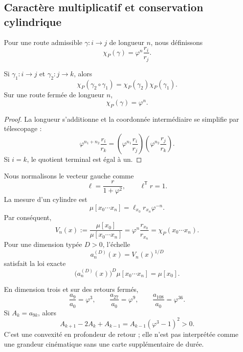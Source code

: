 \subsection{Caractère multiplicatif et conservation cylindrique}

Pour une route admissible \(\gamma:i\to j\) de longueur \(n\), nous définissons
\begin{equation}
 \chi_P(\gamma)=\varphi^n\frac{r_i}{r_j}.
 \label{p12-83-c9-s3:eq:caracter-parry-phi}
\end{equation}

\begin{proposition}
\label{p12-83-c9-s3:prop:multiplicatividad-parry-phi}
Si \(\gamma_1:i\to j\) et \(\gamma_2:j\to k\), alors
\[
 \chi_P(\gamma_2\circ\gamma_1)
 =\chi_P(\gamma_2)\chi_P(\gamma_1).
\]
Sur une route fermée de longueur \(n\),
\[
 \chi_P(\gamma)=\varphi^n.
\]
\end{proposition}

\begin{proof}
La longueur s’additionne et la coordonnée intermédiaire se simplifie par télescopage :
\[
 \varphi^{n_1+n_2}\frac{r_i}{r_k}
 =\left(\varphi^{n_1}\frac{r_i}{r_j}\right)
  \left(\varphi^{n_2}\frac{r_j}{r_k}\right).
\]
Si \(i=k\), le quotient terminal est égal à un.
\end{proof}

Nous normalisons le vecteur gauche comme
\[
 \ell=\frac{r}{1+\varphi^2},
 \qquad
 \ell^{\mathsf T}r=1.
\]
La mesure d’un cylindre est
\[
 \mu[x_0\cdots x_n]
 =\ell_{x_0}r_{x_n}\varphi^{-n}.
\]
Par conséquent,
\begin{equation}
 V_n(x)
 :=\frac{\mu[x_0]}{\mu[x_0\cdots x_n]}
 =\varphi^n\frac{r_{x_0}}{r_{x_n}}
 =\chi_P(x_0\cdots x_n).
 \label{p12-83-c9-s3:eq:volumen-cilindrico-phi}
\end{equation}
Pour une dimension typée \(D>0\), l’échelle
\[
 a_n^{(D)}(x)=V_n(x)^{1/D}
\]
satisfait la loi exacte
\begin{equation}
 \boxed{
 \bigl(a_n^{(D)}(x)\bigr)^D
 \mu[x_0\cdots x_n]=\mu[x_0].}
 \label{p12-83-c9-s3:eq:conservacion-cilindrica-phi}
\end{equation}

En dimension trois et sur des retours fermés,
\[
 \frac{a_9}{a_0}=\varphi^3,
 \qquad
 \frac{a_{27}}{a_0}=\varphi^9,
 \qquad
 \frac{a_{108}}{a_0}=\varphi^{36}.
\]
Si \(A_k=a_{9k}\), alors
\begin{equation}
 A_{k+1}-2A_k+A_{k-1}
 =A_{k-1}(\varphi^3-1)^2>0.
 \label{p12-83-c9-s3:eq:convexidad-retornos-phi}
\end{equation}
C’est une convexité en profondeur de retour ; elle n’est pas interprétée comme une
grandeur cinématique sans une carte supplémentaire de durée.

